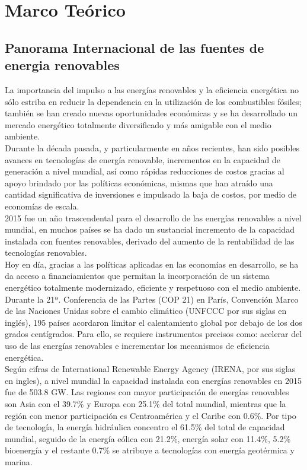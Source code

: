 \chapter{Marco Teórico}
\newpage
\section{Panorama Internacional de las fuentes de energia renovables}
La importancia del impulso a las energías renovables y la eficiencia energética no sólo estriba en reducir la dependencia en la utilización de los combustibles fósiles; también se han creado nuevas oportunidades económicas y se ha desarrollado un mercado energético totalmente diversificado y más amigable con el medio ambiente.\\

Durante la década pasada, y particularmente en años recientes, han sido posibles avances en tecnologías de energía renovable, incrementos en la capacidad de generación a nivel mundial, así como rápidas reducciones de costos gracias al apoyo brindado por las políticas económicas, mismas que han atraído una cantidad significativa de inversiones e impulsado la baja de costos, por medio de economías de escala.\\

2015 fue un año trascendental para el desarrollo de las energías renovables a nivel mundial, en muchos países se ha dado un sustancial incremento de la capacidad instalada con fuentes renovables, derivado del aumento de la rentabilidad de las tecnologías renovables.\\

Hoy en día, gracias a las políticas aplicadas en las economías en desarrollo, se ha da acceso a financiamientos que permitan la incorporación de un sistema energético totalmente modernizado, eficiente y respetuoso con el medio ambiente. Durante la 21ª. Conferencia de las Partes (COP 21) en París, Convención Marco de las Naciones Unidas sobre el cambio climático (UNFCCC por sus siglas en inglés), 195 países acordaron limitar el calentamiento global por debajo de los dos grados centígrados. Para ello, se requiere instrumentos precisos como: acelerar del uso de las energías renovables e incrementar los mecanismos de eficiencia energética.\\

Según cifras de International Renewable Energy Agency (IRENA, por sus siglas en ingles), a nivel mundial la capacidad instalada con energías renovables en 2015 fue de 503.8 GW. Las regiones con mayor participación de energías renovables son Asia con el 39.7\% y Europa con 25.1\% del total mundial, mientras que la región con menor participación es Centroamérica y el Caribe con 0.6\%. Por tipo de tecnología, la energía hidráulica concentro el 61.5\% del total de capacidad mundial, seguido de la energía eólica con 21.2\%, energía solar con 11.4\%, 5.2\% bioenergía y el restante 0.7\% se atribuye a tecnologías con energía geotérmica y marina.\\

